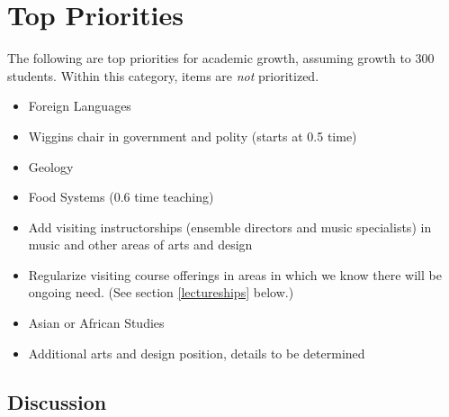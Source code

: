 \documentclass[12pt]{article}
\begin{document}
\section{Top Priorities}

The following are top priorities for academic growth, assuming growth
to 300 students.  Within this category, items are {\em not}
prioritized. 

\begin{itemize}
\setlength{\itemsep}{-1mm}
\item Foreign Languages
\item Wiggins chair in government and polity (starts at 0.5 time)
\item Geology
\item Food Systems (0.6 time teaching)
\item Add visiting instructorships (ensemble directors and music
specialists) in music and other areas of arts and design
\item Regularize visiting course offerings in areas in which we know
there will be ongoing need.  (See section \ref{lectureships} below.)
\item Asian or African Studies
\item Additional arts and design position, details to be determined 

\end{itemize}

\subsection{Discussion}
\end{document}
